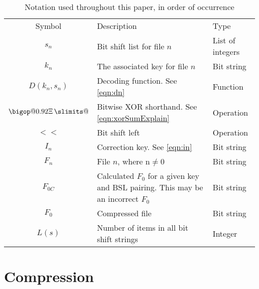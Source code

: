 \documentclass{hehe}
\makeatletter
\DeclareRobustCommand\bigop[2][1]{%
  \mathop{\vphantom{\sum}\mathpalette\bigop@{{#1}{#2}}}\slimits@
}
\newcommand{\bigop@}[2]{\bigop@@#1#2}
\newcommand{\bigop@@}[3]{%
  \vcenter{%
    \sbox\z@{$#1\sum$}%
    \hbox{\resizebox{\ifx#1\displaystyle#2\fi\dimexpr\ht\z@+\dp\z@}{!}{$\m@th#3$}}%
  }%
}
\newcommand{\XORsum}{\DOTSB\bigop[0.92]{\Xi}}
\makeatother
\begin{document}
\begin{table}[ht]
    \centering
    \begin{tabular}{c >{\raggedleft\arraybackslash}p{5.5cm} >{\raggedleft\arraybackslash}p{3cm}}
        \hline
        Symbol & Description & Type \\
        \Xhline{3\arrayrulewidth}
        $s_n$ & Bit shift list for file $n$ & List of integers \\
        $k_n$ & The associated key for file $n$ & Bit string \\
        $D(k_n,s_n)$ & Decoding function. See \cref{eqn:dn} & Function \\
        $\XORsum$ & Bitwise XOR shorthand. See \cref{eqn:xorSumExplain} & Operation \\
        $<<$ & Bit shift left & Operation \\
        $I_n$ & Correction key. See \cref{eqn:in} & Bit string \\
        $F_n$ & File $n$, where n$\neq0$ & Bit string \\
        $F_{0C}$ & Calculated $F_0$ for a given key and BSL pairing. This may be an incorrect $F_0$ & Bit
        string \\
        $F_0$ & Compressed file & Bit string \\
        $L(s)$ & Number of items in all bit shift strings & Integer\\
        \hline
    \end{tabular}
    \caption{Notation used throughout this paper, in order of occurrence}
    \label{tab:notationTable}
\end{table}

\section{Compression}
\end{document}
